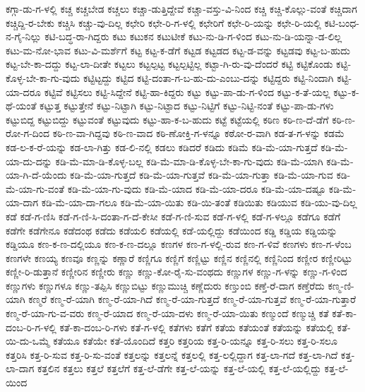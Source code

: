 {ಕಗ್ಗಾ-ಡು-ಗ-ಳಲ್ಲಿ
ಕಚ್ಚ
ಕಚ್ಚಬೇಡ
ಕಚ್ಚಲು
ಕಚ್ಚಾ-ಡುತ್ತಿದ್ದೇವೆ
ಕಚ್ಚಾ-ವಸ್ತು-ವಿ-ನಿಂದ
ಕಚ್ಚಿ
ಕಚ್ಚಿ-ಕೊಲ್ಲು-ವಂತೆ
ಕಚ್ಚಿದಾಗ
ಕಚ್ಚಿದ್ದಿ-ರ-ಬೇಕು
ಕಚ್ಚಿಸಿ
ಕಚ್ಚು-ವು-ದಿಲ್ಲ
ಕಛೇರಿ
ಕಛೇ-ರಿ-ಗ-ಳಲ್ಲಿ
ಕಛೇರಿಗೆ
ಕಛೇ-ರಿ-ಯನ್ನು
ಕಛೇ-ರಿ-ಯಲ್ಲಿ
ಕಟಿ-ಬಂಧ-ನ-ಗೈ-ನಿಲ್ಲು
ಕಟಿ-ಬದ್ಧ-ರಾ-ಗಿದ್ದರು
ಕಟು
ಕಟುಕನ
ಕಟುಟೀಕೆ
ಕಟು-ನು-ಡಿ-ಗ-ಳಿಂದ
ಕಟು-ನು-ಡಿ-ಯನ್ನಾ-ಡ-ಲಿಲ್ಲ
ಕಟು-ಮ-ನೋ-ಭಾವ
ಕಟು-ವಿ-ಮರ್ಶೆಗೆ
ಕಟ್ಟ
ಕಟ್ಟ-ಕ-ಡೆಗೆ
ಕಟ್ಟಡ
ಕಟ್ಟಡದ
ಕಟ್ಟ-ಡ-ವನ್ನು
ಕಟ್ಟಡವು
ಕಟ್ಟ-ಬ-ಹುದು
ಕಟ್ಟ-ಬೇ-ಕಾ-ದದ್ದು
ಕಟ್ಟ-ಲಾ-ದೀತೇ
ಕಟ್ಟಲು
ಕಟ್ಟಲ್ಪಟ್ಟ
ಕಟ್ಟಲ್ಪಟ್ಟಿಲ್ಲ
ಕಟ್ಟಾ-ಗಿ-ರು-ವು-ದೆಂದರೆ
ಕಟ್ಟಿ
ಕಟ್ಟಿಕೊಂಡು
ಕಟ್ಟಿ-ಕೊಳ್ಳ-ಬೇ-ಕಾ-ಗು-ವುದು
ಕಟ್ಟಿಟ್ಟದ್ದು
ಕಟ್ಟಿದ
ಕಟ್ಟಿ-ದಂತಾ-ಗ-ಬ-ಹು-ದು-ಎಂಬು-ದನ್ನು
ಕಟ್ಟಿದ್ದರು
ಕಟ್ಟಿ-ನಿಂದಾಗಿ
ಕಟ್ಟಿ-ಯಾ-ದರೂ
ಕಟ್ಟಿವೆ
ಕಟ್ಟಿಸಲು
ಕಟ್ಟಿ-ಸಿದ್ದೇನೆ
ಕಟ್ಟಿ-ಹಾ-ಕಿದ್ದರು
ಕಟ್ಟು
ಕಟ್ಟು-ಪಾ-ಡು-ಗ-ಳಿಂದ
ಕಟ್ಟು-ಕ-ತೆ-ಯಲ್ಲ
ಕಟ್ಟು-ಕ-ಥೆ-ಯಂತೆ
ಕಟ್ಟುತ್ತ
ಕಟ್ಟುತ್ತೇನೆ
ಕಟ್ಟು-ನಿಟ್ಟಾಗಿ
ಕಟ್ಟು-ನಿಟ್ಟಾದ
ಕಟ್ಟು-ನಿಟ್ಟಿಗೆ
ಕಟ್ಟು-ನಿಟ್ಟಿ-ನಂತೆ
ಕಟ್ಟು-ಪಾ-ಡು-ಗಳು
ಕಟ್ಟುಬಿದ್ದ
ಕಟ್ಟುಬಿದ್ದು
ಕಟ್ಟುವಂತೆ
ಕಟ್ಟುವುದು
ಕಟ್ಟು-ಹಾ-ಕ-ಬ-ಹುದು
ಕಟ್ಟೆ
ಕಟ್ಟೆಯಲ್ಲಿ
ಕಠಿಣ
ಕಠಿ-ಣ-ದೆ-ಡೆಗೆ
ಕಠಿ-ಣ-ರೋ-ಗ-ದಿಂದ
ಕಠಿ-ಣ-ವಾ-ಗಿದ್ದವು
ಕಠಿ-ಣ-ವಾದ
ಕಠಿ-ಣೋಕ್ತಿ-ಗ-ಳನ್ನೂ
ಕಠೋ-ರ-ವಾಗಿ
ಕಡ-ತ-ಗ-ಳನ್ನು
ಕಡಮೆ
ಕಡ-ಲ-ಕ-ರೆ-ಯನ್ನು
ಕಡ-ಲಾ-ಗಿತ್ತು
ಕಡ-ಲಿ-ನಲ್ಲಿ
ಕಡಲು
ಕಡಿದರೆ
ಕಡಿದು
ಕಡಿಮೆ
ಕಡಿ-ಮೆ-ಯಾ-ಗುತ್ತದೆ
ಕಡಿ-ಮೆ-ಯಾ-ದು-ದನ್ನು
ಕಡಿ-ಮೆ-ಮಾ-ಡಿ-ಕೊಳ್ಳ-ಬಲ್ಲ
ಕಡಿ-ಮೆ-ಮಾ-ಡಿ-ಕೊಳ್ಳ-ಬೇ-ಕಾ-ಗು-ವುದು
ಕಡಿ-ಮೆ-ಯಾಗಿ
ಕಡಿ-ಮೆ-ಯಾ-ಗಿ-ದೆ-ಯೆಂದು
ಕಡಿ-ಮೆ-ಯಾ-ಗುತ್ತದೆ
ಕಡಿ-ಮೆ-ಯಾ-ಗುತ್ತವೆ
ಕಡಿ-ಮೆ-ಯಾ-ಗುತ್ತಾ
ಕಡಿ-ಮೆ-ಯಾ-ಗುವ
ಕಡಿ-ಮೆ-ಯಾ-ಗು-ವಂತೆ
ಕಡಿ-ಮೆ-ಯಾ-ಗು-ವುದು
ಕಡಿ-ಮೆ-ಯಾದ
ಕಡಿ-ಮೆ-ಯಾ-ದರೂ
ಕಡಿ-ಮೆ-ಯಾ-ದಷ್ಟೂ
ಕಡಿ-ಮೆ-ಯಾ-ದಾಗ
ಕಡಿ-ಮೆ-ಯಾ-ದಾ-ಗಲೂ
ಕಡಿ-ಮೆ-ಯಾ-ಯಿತು
ಕಡಿ-ಯಿ-ತಂತೆ
ಕಡಿಯಿತು
ಕಡಿಯುವ
ಕಡಿ-ಯು-ವು-ದಿಲ್ಲ
ಕಡೆ
ಕಡೆ-ಗ-ಣಿಸಿ
ಕಡೆ-ಗ-ಣಿ-ಸಿ-ದಂತಾ-ಗ-ದೆ-ಕೇಸೀ
ಕಡೆ-ಗ-ಣಿ-ಸುವ
ಕಡೆ-ಗ-ಳಲ್ಲಿ
ಕಡೆ-ಗ-ಳಲ್ಲೂ
ಕಡೆಗೂ
ಕಡೆಗೆ
ಕಡೆಗೇ
ಕಡೆಗೇನೂ
ಕಡೆದಂಥ
ಕಡೆದು
ಕಡೆಯಲಿ
ಕಡೆಯಲ್ಲಿ
ಕಡೆ-ಯಲ್ಲಿದ್ದು
ಕಡೆಯಿಂದ
ಕಡ್ಡಿ
ಕಡ್ಡಿಯ
ಕಡ್ಡಿಯನ್ನು
ಕಡ್ಡಿಯೂ
ಕಣ-ಕ-ಣ-ದಲ್ಲಿಯೂ
ಕಣ-ಕ-ಣ-ದಲ್ಲೂ
ಕಣಗಳ
ಕಣ-ಗ-ಳಲ್ಲಿ-ರುವ
ಕಣ-ಗ-ಳಿವೆ
ಕಣಗಳು
ಕಣ-ಗ-ಳೆಂಬ
ಕಣಗಳೇ
ಕಣಯ್ಯ
ಕಣವೂ
ಕಣ್ಣನ್ನು
ಕಣ್ಣಾರೆ
ಕಣ್ಣಿಗೂ
ಕಣ್ಣಿಗೆ
ಕಣ್ಣಿಟ್ಟು
ಕಣ್ಣಿನ
ಕಣ್ಣಿನಲ್ಲಿ
ಕಣ್ಣಿನಿಂದ
ಕಣ್ಣೀರ
ಕಣ್ಣೀರಿಟ್ಟು
ಕಣ್ಣೀ-ರಿ-ಡುತ್ತಾನೆ
ಕಣ್ಣೀರಿನ
ಕಣ್ಣೀರು
ಕಣ್ಣು
ಕಣ್ಣು-ಕೋ-ರೈ-ಸು-ವಂಥದು
ಕಣ್ಣುಗಳ
ಕಣ್ಣು-ಗ-ಳನ್ನು
ಕಣ್ಣು-ಗ-ಳಿಂದ
ಕಣ್ಣುಗಳು
ಕಣ್ಣುಗಳೂ
ಕಣ್ಣು-ತಪ್ಪಿಸಿ
ಕಣ್ಣುಬಿಟ್ಟು
ಕಣ್ಣುಮುಚ್ಚಿ
ಕಣ್ಣೆದುರು
ಕಣ್ತುಂಬಿ
ಕಣ್ತೆ-ರೆ-ದಾಗ
ಕಣ್ತೆರೆದು
ಕಣ್ಮ-ಣಿ-ಯಾಗಿ
ಕಣ್ಮರೆ
ಕಣ್ಮ-ರೆ-ಯಾಗಿ
ಕಣ್ಮ-ರೆ-ಯಾ-ಗಿದೆ
ಕಣ್ಮ-ರೆ-ಯಾ-ಗುತ್ತದೆ
ಕಣ್ಮ-ರೆ-ಯಾ-ಗುತ್ತವೆ
ಕಣ್ಮ-ರೆ-ಯಾ-ಗುತ್ತಾರೆ
ಕಣ್ಮ-ರೆ-ಯಾ-ಗು-ವ-ವರು
ಕಣ್ಮ-ರೆ-ಯಾದ
ಕಣ್ಮ-ರೆ-ಯಾ-ದಳು
ಕಣ್ಮ-ರೆ-ಯಾ-ಯಿತು
ಕಣ್ಮುಂದೆ
ಕಣ್ಮುಚ್ಚಿ
ಕತೆ
ಕತೆ-ಕಾ-ದಂಬ-ರಿ-ಗ-ಳಲ್ಲಿ
ಕತೆ-ಕಾ-ದಂಬ-ರಿ-ಗಳು
ಕತೆ-ಗ-ಳಲ್ಲಿ
ಕತೆಗಳು
ಕತೆಗೆ
ಕತೆಯ
ಕತೆಯಂತೆ
ಕತೆಯನ್ನು
ಕತೆಯಲ್ಲಿ
ಕತೆ-ಯಿ-ದು-ಒಮ್ಮೆ
ಕತೆಯೂ
ಕತೆಯೇ
ಕತೆ-ಯೊಂದಿದೆ
ಕತ್ತರಿ
ಕತ್ತರಿಯ
ಕತ್ತ-ರಿ-ಯನ್ನೂ
ಕತ್ತ-ರಿ-ಸಲು
ಕತ್ತ-ರಿ-ಸಲೂ
ಕತ್ತರಿಸಿ
ಕತ್ತ-ರಿ-ಸುವ
ಕತ್ತ-ರಿ-ಸು-ವಂತೆ
ಕತ್ತಲನ್ನು
ಕತ್ತಲನ್ನೆ
ಕತ್ತಲಲ್ಲಿ
ಕತ್ತ-ಲಲ್ಲಿದ್ದಾಗ
ಕತ್ತ-ಲಾ-ಗದೆ
ಕತ್ತ-ಲಾ-ಗಿದೆ
ಕತ್ತ-ಲಾ-ದಾಗ
ಕತ್ತಲಿನ
ಕತ್ತಲು
ಕತ್ತಲೆ
ಕತ್ತಲೆಗೆ
ಕತ್ತ-ಲೆ-ಡೆಗೇ
ಕತ್ತ-ಲೆ-ಯನ್ನು
ಕತ್ತ-ಲೆ-ಯಲ್ಲಿ
ಕತ್ತ-ಲೆ-ಯಲ್ಲಿದ್ದು
ಕತ್ತ-ಲೆ-ಯಿಂದ
}
